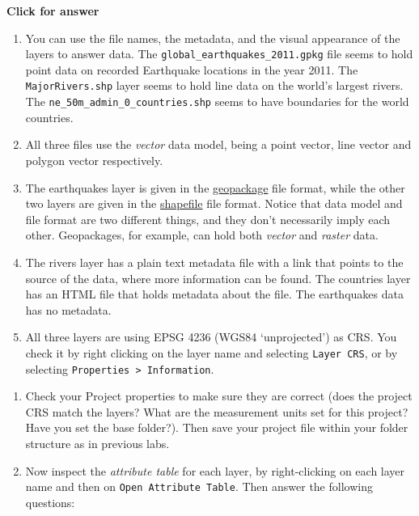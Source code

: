 \documentclass[
  letterpaper,
  DIV=11,
  numbers=noendperiod]{scrreprt}
\begin{document}
\begin{tcolorbox}[enhanced jigsaw, toprule=.15mm, breakable, left=2mm, colframe=quarto-callout-important-color-frame, colback=white, arc=.35mm, leftrule=.75mm, opacityback=0, rightrule=.15mm, bottomrule=.15mm]

\vspace{-3mm}\textbf{Click for answer}\vspace{3mm}

\begin{enumerate}
\def\labelenumi{\alph{enumi})}
\item
  You can use the file names, the metadata, and the visual appearance of
  the layers to answer data. The \texttt{global\_earthquakes\_2011.gpkg}
  file seems to hold point data on recorded Earthquake locations in the
  year 2011. The \texttt{MajorRivers.shp} layer seems to hold line data
  on the world's largest rivers. The
  \texttt{ne\_50m\_admin\_0\_countries.shp} seems to have boundaries for
  the world countries.
\item
  All three files use the \emph{vector} data model, being a point
  vector, line vector and polygon vector respectively.
\item
  The earthquakes layer is given in the
  \href{https://www.geopackage.org/}{geopackage} file format, while the
  other two layers are given in the
  \href{https://doc.arcgis.com/en/arcgis-online/reference/shapefiles.htm}{shapefile}
  file format. Notice that data model and file format are two different
  things, and they don't necessarily imply each other. Geopackages, for
  example, can hold both \emph{vector} and \emph{raster} data.
\item
  The rivers layer has a plain text metadata file with a link that
  points to the source of the data, where more information can be found.
  The countries layer has an HTML file that holds metadata about the
  file. The earthquakes data has no metadata.
\item
  All three layers are using EPSG 4236 (WGS84 `unprojected') as CRS. You
  check it by right clicking on the layer name and selecting
  \texttt{Layer\ CRS}, or by selecting
  \texttt{Properties\ \textgreater{}\ Information}.
\end{enumerate}

\end{tcolorbox}

\begin{enumerate}
\def\labelenumi{(\arabic{enumi})}
\setcounter{enumi}{66}
\item
  Check your Project properties to make sure they are correct (does the
  project CRS match the layers? What are the measurement units set for
  this project? Have you set the base folder?). Then save your project
  file within your folder structure as in previous labs.
\item
  Now inspect the \emph{attribute table} for each layer, by
  right-clicking on each layer name and then on
  \texttt{Open\ Attribute\ Table}. Then answer the following questions:
\end{enumerate}
\end{document}
